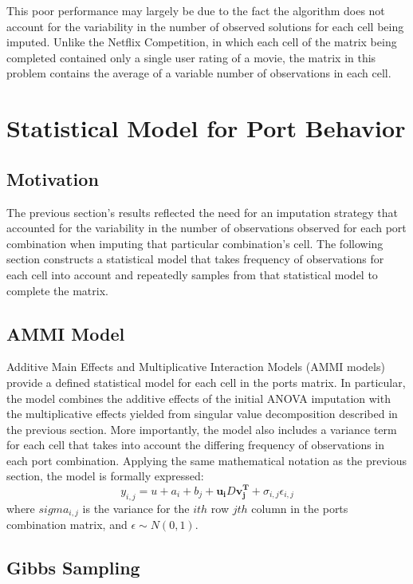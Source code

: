 \documentclass[12pt,twoside]{dukestatscithesis}
\theoremstyle{definition}
\theoremstyle{definition}
\theoremstyle{definition}
\theoremstyle{remark}
\begin{document}
This poor performance may largely be due to the fact the algorithm does
not account for the variability in the number of observed solutions for
each cell being imputed. Unlike the Netflix Competition, in which each
cell of the matrix being completed contained only a single user rating
of a movie, the matrix in this problem contains the average of a
variable number of observations in each cell.

\chapter{Statistical Model for Port
Behavior}\label{statistical-model-for-port-behavior}

\section{Motivation}\label{motivation-3}

The previous section's results reflected the need for an imputation
strategy that accounted for the variability in the number of
observations observed for each port combination when imputing that
particular combination's cell. The following section constructs a
statistical model that takes frequency of observations for each cell
into account and repeatedly samples from that statistical model to
complete the matrix.

\section{AMMI Model}\label{ammi-model}

Additive Main Effects and Multiplicative Interaction Models (AMMI
models) provide a defined statistical model for each cell in the ports
matrix. In particular, the model combines the additive effects of the
initial ANOVA imputation with the multiplicative effects yielded from
singular value decomposition described in the previous section. More
importantly, the model also includes a variance term for each cell that
takes into account the differing frequency of observations in each port
combination. Applying the same mathematical notation as the previous
section, the model is formally expressed:
\[y_{i,j} = u + a_i + b_j + \mathbf{u_i}D\mathbf{v_j^T} + \sigma_{i,j}\epsilon_{i,j}\]
where \(sigma_{i,j}\) is the variance for the \(ith\) row \(jth\) column
in the ports combination matrix, and \(\epsilon \sim N(0,1)\).

\section{Gibbs Sampling}\label{gibbs-sampling}
\end{document}
